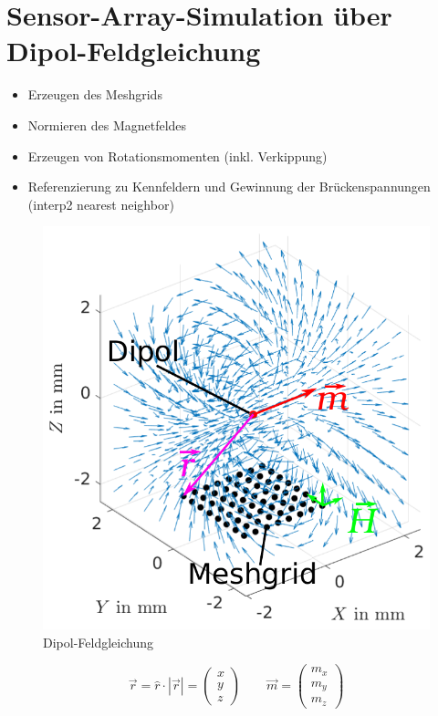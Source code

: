 %

\section{Sensor-Array-Simulation über Dipol-Feldgleichung}\label{sec:sensor-array-simulation-dipol-feldgleichung}


\begin{itemize}
	\item Erzeugen des Meshgrids
	\item Normieren des Magnetfeldes
	\item Erzeugen von Rotationsmomenten (inkl. Verkippung)
	\item Referenzierung zu Kennfeldern und Gewinnung der Brückenspannungen (interp2 nearest neighbor)
\end{itemize}


\begin{figure}[tbph]
	\centering
	\includegraphics[width=0.7\linewidth]{chapters/images/2-Grundlagen/Dipol-Feldgleichung}
	\caption[Dipol-Feldgleichung]{Dipol-Feldgleichung}
	\label{fig:dipol-feldgleichung}
\end{figure}



\begin{equation}
\vec{r} = \hat{r} \cdot |\vec{r}| = \begin{pmatrix} x \\ y \\ z \end{pmatrix} \qquad \vec{m} = \begin{pmatrix} m_x \\ m_y \\ m_z \end{pmatrix}
\end{equation}


